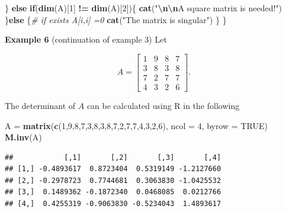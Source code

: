 \documentclass[
]{book}
\newenvironment{Shaded}{\begin{snugshade}}{\end{snugshade}}
\newcommand{\AttributeTok}[1]{\textcolor[rgb]{0.13,0.29,0.53}{#1}}
\newcommand{\CommentTok}[1]{\textcolor[rgb]{0.56,0.35,0.01}{\textit{#1}}}
\newcommand{\ConstantTok}[1]{\textcolor[rgb]{0.56,0.35,0.01}{#1}}
\newcommand{\ControlFlowTok}[1]{\textcolor[rgb]{0.13,0.29,0.53}{\textbf{#1}}}
\newcommand{\DecValTok}[1]{\textcolor[rgb]{0.00,0.00,0.81}{#1}}
\newcommand{\FunctionTok}[1]{\textcolor[rgb]{0.13,0.29,0.53}{\textbf{#1}}}
\newcommand{\NormalTok}[1]{#1}
\newcommand{\OtherTok}[1]{\textcolor[rgb]{0.56,0.35,0.01}{#1}}
\newcommand{\SpecialCharTok}[1]{\textcolor[rgb]{0.81,0.36,0.00}{\textbf{#1}}}
\newcommand{\StringTok}[1]{\textcolor[rgb]{0.31,0.60,0.02}{#1}}
\begin{document}
\begin{Shaded}
\begin{Highlighting}[]
\NormalTok{           \} }\ControlFlowTok{else} \ControlFlowTok{if}\NormalTok{(}\FunctionTok{dim}\NormalTok{(A)[}\DecValTok{1}\NormalTok{] }\SpecialCharTok{!=} \FunctionTok{dim}\NormalTok{(A)[}\DecValTok{2}\NormalTok{])\{}
               \FunctionTok{cat}\NormalTok{(}\StringTok{"}\SpecialCharTok{\textbackslash{}n\textbackslash{}n}\StringTok{A square matrix is needed!"}\NormalTok{)}
\NormalTok{           \}}\ControlFlowTok{else}\NormalTok{ \{}\CommentTok{\# if exists A[i,i] =0}
             \FunctionTok{cat}\NormalTok{(}\StringTok{"The matrix is singular"}\NormalTok{)}
\NormalTok{          \}}
\NormalTok{ \}}
\end{Highlighting}
\end{Shaded}

\textbf{Example 6} (continuation of example 3) Let

\[
A = \left[\begin{array}{cccc} 
1 & 9 & 8 & 7 \\ 
3 & 8 & 3 & 8\\ 
7 & 2 & 7 & 7\\
4 & 3 & 2 & 6
\end{array}
\right].
\]

The determinant of \(A\) can be calculated using R in the following

\begin{Shaded}
\begin{Highlighting}[]
\NormalTok{A }\OtherTok{=} \FunctionTok{matrix}\NormalTok{(}\FunctionTok{c}\NormalTok{(}\DecValTok{1}\NormalTok{,}\DecValTok{9}\NormalTok{,}\DecValTok{8}\NormalTok{,}\DecValTok{7}\NormalTok{,}\DecValTok{3}\NormalTok{,}\DecValTok{8}\NormalTok{,}\DecValTok{3}\NormalTok{,}\DecValTok{8}\NormalTok{,}\DecValTok{7}\NormalTok{,}\DecValTok{2}\NormalTok{,}\DecValTok{7}\NormalTok{,}\DecValTok{7}\NormalTok{,}\DecValTok{4}\NormalTok{,}\DecValTok{3}\NormalTok{,}\DecValTok{2}\NormalTok{,}\DecValTok{6}\NormalTok{), }\AttributeTok{ncol =} \DecValTok{4}\NormalTok{, }\AttributeTok{byrow =} \ConstantTok{TRUE}\NormalTok{)}
\FunctionTok{M.inv}\NormalTok{(A)   }
\end{Highlighting}
\end{Shaded}

\begin{verbatim}
##            [,1]       [,2]       [,3]       [,4]
## [1,] -0.4893617  0.8723404  0.5319149 -1.2127660
## [2,] -0.2978723  0.7744681  0.3063830 -1.0425532
## [3,]  0.1489362 -0.1872340  0.0468085  0.0212766
## [4,]  0.4255319 -0.9063830 -0.5234043  1.4893617
\end{verbatim}
\end{document}
